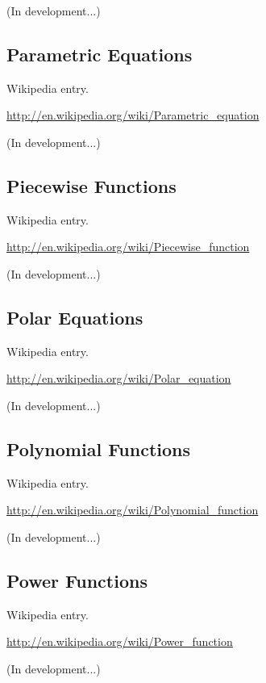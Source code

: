 \documentclass[12pt,oneside]{book}
\begin{document}
(In development...)

\subsection[Parametric Equations]{Parametric Equations}

Wikipedia entry.

\href{http://en.wikipedia.org/wiki/Parametric_equation}{http://en.wikipedia.org/wiki/Parametric\_equation}

(In development...)

\subsection[Piecewise Functions]{Piecewise Functions}

Wikipedia entry.

\href{http://en.wikipedia.org/wiki/Piecewise_function}{http://en.wikipedia.org/wiki/Piecewise\_function}

(In development...)

\subsection[Polar Equations]{Polar Equations}

Wikipedia entry.

\href{http://en.wikipedia.org/wiki/Polar_equation}{http://en.wikipedia.org/wiki/Polar\_equation}

(In development...)

\subsection[Polynomial Functions]{Polynomial Functions}

Wikipedia entry.

\href{http://en.wikipedia.org/wiki/Polynomial_function}{http://en.wikipedia.org/wiki/Polynomial\_function}

(In development...)

\subsection[Power Functions]{Power Functions}

Wikipedia entry.

\href{http://en.wikipedia.org/wiki/Power_function}{http://en.wikipedia.org/wiki/Power\_function}

(In development...)
\end{document}
